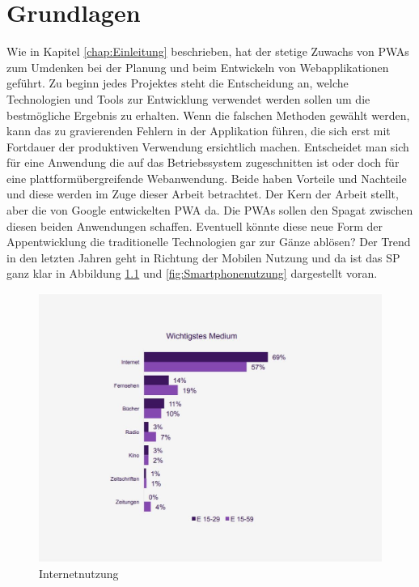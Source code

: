 \chapter{Grundlagen}
\thispagestyle{standard}
\pagestyle{standard}
\renewcommand{\footrulewidth}{0.4pt}

Wie in Kapitel \ref{chap:Einleitung} beschrieben, hat der stetige Zuwachs von \acl{PWA}s \cite{PWA} zum Umdenken bei der Planung und beim Entwickeln von Webapplikationen geführt.
Zu beginn jedes Projektes steht die Entscheidung an, welche Technologien und Tools zur Entwicklung verwendet werden sollen um die bestmögliche Ergebnis zu erhalten.
Wenn die falschen Methoden gewählt werden, kann das zu gravierenden Fehlern in der Applikation führen, die sich erst mit Fortdauer der produktiven Verwendung ersichtlich machen.
Entscheidet man sich für eine Anwendung die auf das Betriebssystem zugeschnitten ist oder doch für eine plattformübergreifende Webanwendung. Beide haben Vorteile und Nachteile und diese werden im Zuge dieser Arbeit betrachtet. Der Kern der Arbeit stellt, aber die von Google entwickelten \acs{PWA} da. Die \acs{PWA}s sollen den Spagat zwischen diesen beiden Anwendungen schaffen. Eventuell könnte diese neue Form der Appentwicklung die traditionelle Technologien gar zur Gänze ablösen?
Der Trend in den letzten Jahren geht in Richtung der Mobilen Nutzung und da ist das \acl{SP} ganz klar in Abbildung \ref{fig:Internetnutzung} und \ref{fig:Smartphonenutzung} dargestellt voran.  

\begin{figure}[h]
	\centering
	\includegraphics[width=14cm]{BilderAllgemein/Internetnutzung}\medskip
	\caption{Internetnutzung \cite{Geraetenutzung}}
	\label{fig:Internetnutzung}
\end{figure}

